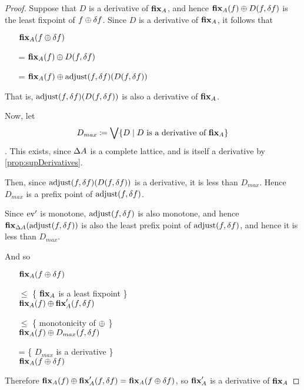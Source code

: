 \begin{proof}
  Suppose that $D$ is a derivative of $\textbf{fix}_A$, and hence $\textbf{fix}_A(f) \oplus D(f,
  \delta f)$ is the least fixpoint of $f \oplus \delta f$. 
  Since $D$ is a derivative of $\textbf{fix}_A$, it follows that 
  \begin{itemize}
    \item[ ]$\textbf{fix}_A (f \oplus \delta f)$
    \item[=]$\textbf{fix}_A(f) \oplus D(f, \delta f)$
    \item[=]$\textbf{fix}_A(f) \oplus \operatorname{adjust}(f, \delta f)(D(f, \delta f))$
  \end{itemize}

  That is, $\operatorname{adjust}(f, \delta f)(D(f, \delta f))$ is also a
  derivative of $\textbf{fix}_A$.

  Now, let $$D_{max} \coloneqq \bigvee \{D \mid D \textrm{ is a derivative of }
  \textbf{fix}_A \}$$. This exists, since $\Delta A$ is a complete lattice, and
  is itself a derivative by \cref{prop:supDerivatives}.

  Then, since 
  $\operatorname{adjust}(f, \delta f)(D(f, \delta f))$ is a
  derivative, it is less than $D_{max}$. Hence $D_{max}$ is a prefix point of
  $\operatorname{adjust}(f, \delta f)$.

  Since $\operatorname{ev}'$ is monotone, $\operatorname{adjust}(f, \delta f)$ is also monotone, and
  hence $\textbf{fix}_{\Delta A}(\operatorname{adjust}(f, \delta f))$ is also the
  least prefix point of $\operatorname{adjust}(f, \delta f)$, and hence it is less
  than $D_{max}$.

  And so 
  \begin{itemize}
    \item[ ]
      $\textbf{fix}_A(f \oplus \delta f)$
    \item[$\leq$]\{ $\textbf{fix}_A$ is a least fixpoint \}\\
      $\textbf{fix}_A(f) \oplus \textbf{fix}_A'(f, \delta f)$
    \item[$\leq$]\{ monotonicity of $\oplus$ \}\\
      $\textbf{fix}_A(f) \oplus D_{max}(f, \delta f)$
    \item[=]\{ $D_{max}$ is a derivative \}\\
      $\textbf{fix}_A(f \oplus \delta f)$
  \end{itemize}

  Therefore $\textbf{fix}_A(f) \oplus \textbf{fix}_A'(f, \delta f) =
  \textbf{fix}_A(f \oplus \delta f)$, so $\textbf{fix}_A'$ is a derivative of $\textbf{fix}_A$
\end{proof}
\fi

